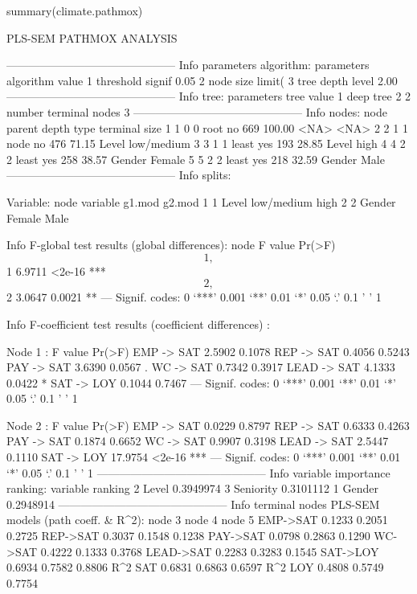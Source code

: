 \begin{example}
summary(climate.pathmox)

PLS-SEM PATHMOX ANALYSIS

--------------------------------------------- Info parameters algorithm:
parameters algorithm value 1 threshold signif 0.05 2 node size limit( 3
tree depth level 2.00 --------------------------------------------- Info
tree: parameters tree value 1 deep tree 2 2 number terminal nodes 3
--------------------------------------------- Info nodes: node parent
depth type terminal size 1 1 0 0 root no 669 100.00 \textless NA\textgreater{} \textless NA\textgreater{} 2 2 1
1 node no 476 71.15 Level low/medium 3 3 1 1 least yes 193 28.85 Level
high 4 4 2 2 least yes 258 38.57 Gender Female 5 5 2 2 least yes 218
32.59 Gender Male --------------------------------------------- Info
splits:

Variable: node variable g1.mod g2.mod 1 1 Level low/medium high 2 2
Gender Female Male

Info F-global test results (global differences): node F value Pr(\textgreater F)
\[1,\] 1 6.9711 \textless2e-16 *** \[2,\] 2 3.0647 0.0021 ** --- Signif.
codes: 0 `***' 0.001 `**' 0.01 `*' 0.05 `.' 0.1 ' ' 1

Info F-coefficient test results (coefficient differences) :

Node 1 : F value Pr(\textgreater F) EMP -\textgreater{} SAT 2.5902 0.1078 REP -\textgreater{} SAT 0.4056
0.5243 PAY -\textgreater{} SAT 3.6390 0.0567 . WC -\textgreater{} SAT 0.7342 0.3917 LEAD -\textgreater{} SAT
4.1333 0.0422 * SAT -\textgreater{} LOY 0.1044 0.7467 --- Signif. codes: 0 `***'
0.001 `**' 0.01 `*' 0.05 `.' 0.1 ' ' 1

Node 2 : F value Pr(\textgreater F) EMP -\textgreater{} SAT 0.0229 0.8797 REP -\textgreater{} SAT 0.6333
0.4263 PAY -\textgreater{} SAT 0.1874 0.6652 WC -\textgreater{} SAT 0.9907 0.3198 LEAD -\textgreater{} SAT
2.5447 0.1110 SAT -\textgreater{} LOY 17.9754 \textless2e-16 *** --- Signif. codes: 0
`***' 0.001 `**' 0.01 `*' 0.05 `.' 0.1 ' ' 1
--------------------------------------------- Info variable importance
ranking: variable ranking 2 Level 0.3949974 3 Seniority 0.3101112 1
Gender 0.2948914 --------------------------------------------- Info
terminal nodes PLS-SEM models (path coeff. \& R\^{}2): node 3 node 4 node 5
EMP-\textgreater SAT 0.1233 0.2051 0.2725 REP-\textgreater SAT 0.3037 0.1548 0.1238 PAY-\textgreater SAT
0.0798 0.2863 0.1290 WC-\textgreater SAT 0.4222 0.1333 0.3768 LEAD-\textgreater SAT 0.2283
0.3283 0.1545 SAT-\textgreater LOY 0.6934 0.7582 0.8806 R\^{}2 SAT 0.6831 0.6863
0.6597 R\^{}2 LOY 0.4808 0.5749 0.7754
\end{example}


